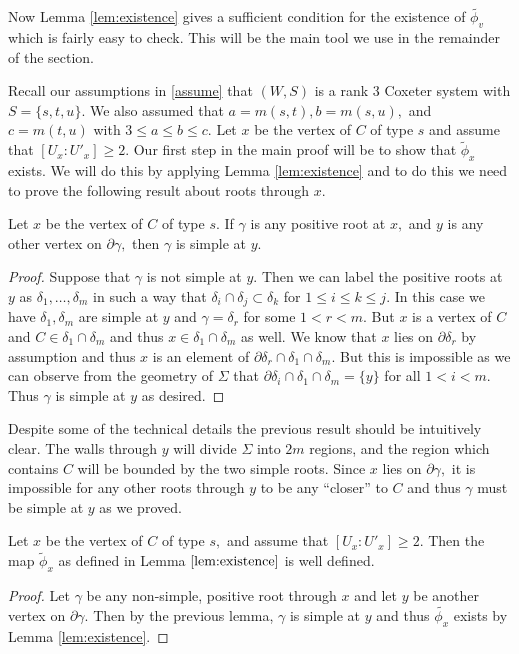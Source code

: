 \documentclass[class=book, crop=false,12 pt]{standalone}
\begin{document}
Now Lemma \ref{lem:existence} gives a sufficient condition for the existence of $\tilde{\phi_v}$ which is fairly easy to check. This will be the main tool we use in the remainder of the section. 

Recall our assumptions in \eqref{assume} that $(W,S)$ is a rank 3 Coxeter system with $S=\{s,t,u\}.$ We also assumed that $a=m(s,t),b=m(s,u),$ and $c=m(t,u)$ with $3\le a\le b \le c.$ Let $x$ be the vertex of $C$ of type $s$ and assume that $[U_x:U'_x]\ge 2.$ Our first step in the main proof will be to show that $\tilde{\phi}_x$ exists. We will do this by applying Lemma \ref{lem:existence} and to do this we need to prove the following result about roots through $x.$

\begin{lemma}
\label{lem:xpos}
	Let $x$ be the vertex of $C$ of type $s.$ If $\gamma$ is any positive root at $x,$ and $y$ is any other vertex on $\partial\gamma,$ then $\gamma$ is simple at $y.$
\end{lemma}
\begin{proof} 
	Suppose that $\gamma$ is not simple at $y.$ Then we can label the positive roots at $y$ as $\delta_1,\dots,\delta_m$ in such a way that $\delta_i\cap \delta_j\subset \delta_k$ for $1\le i\le k\le j.$ In this case we have $\delta_1,\delta_m$ are simple at $y$ and $\gamma=\delta_r$ for some $1<r<m.$ But $x$ is a vertex of $C$ and $C\in \delta_1\cap \delta_m$ and thus $x\in \delta_1\cap \delta_m$ as well. We know that $x$ lies on $\partial \delta_r$ by assumption and thus $x$ is an element of $\partial \delta_r \cap \delta_1\cap \delta_m.$ But this is impossible as we can observe from the geometry of $\Sigma$ that $\partial \delta_i\cap \delta_1\cap \delta_m=\{y\}$ for all $1<i<m.$ Thus $\gamma$ is simple at $y$ as desired.
\end{proof}
Despite some of the technical details the previous result should be intuitively clear. The walls through $y$ will divide $\Sigma$ into $2m$ regions, and the region which contains $C$ will be bounded by the two simple roots. Since $x$ lies on $\partial \gamma,$ it is impossible for any other roots through $y$ to be any ``closer'' to $C$ and thus $\gamma$ must be simple at $y$ as we proved.
\begin{cor}
	\label{cor:phix}
	Let $x$ be the vertex of $C$ of type $s,$ and assume that $[U_x:U'_x]\ge 2.$ Then the map $\tilde{\phi}_x$ as defined in Lemma $\ref{lem:existence}$ is well defined.
\end{cor}
\begin{proof}
	Let $\gamma$ be any non-simple, positive root through $x$ and let $y$ be another vertex on $\partial \gamma.$ Then by the previous lemma, $\gamma$ is simple at $y$ and thus $\tilde{\phi_x}$ exists by Lemma \ref{lem:existence}.
\end{proof}
\end{document}
